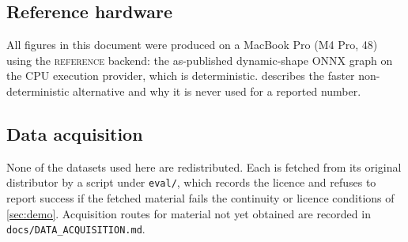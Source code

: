 \subsection{Reference hardware}

All figures in this document were produced on a MacBook Pro (M4 Pro,
\SI{48}{\gigabyte}) using the \textsc{reference} backend: the as-published
dynamic-shape ONNX graph on the CPU execution provider, which is
deterministic.  describes the faster non-deterministic
alternative and why it is never used for a reported number.

\subsection{Data acquisition}

None of the datasets used here are redistributed. Each is fetched from its
original distributor by a script under \texttt{eval/}, which records the
licence and refuses to report success if the fetched material fails the
continuity or licence conditions of \cref{sec:demo}. Acquisition routes for
material not yet obtained are recorded in \texttt{docs/DATA\_ACQUISITION.md}.
